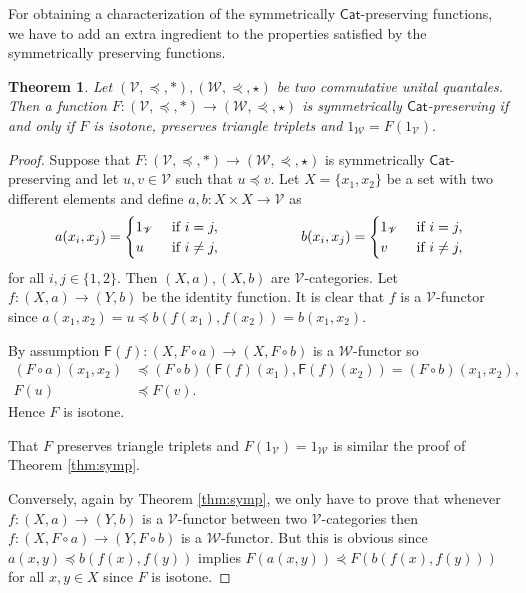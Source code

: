 \documentclass[11pt,a4paper]{amsart}
\newtheorem{theorem}{Theorem}[section]
\theoremstyle{definition}
\begin{document}
	For obtaining a characterization of the symmetrically $\mathsf{Cat}$-preserving functions, we have to add an extra ingredient to the properties satisfied by the symmetrically preserving functions.
	
	\begin{theorem}\label{thm:csymp}
		Let $(\mathscr{V},\preceq,\ast),(\mathscr{W},\curlyeqprec,\star)$ be two commutative unital quantales. Then a function $F:(\mathscr{V},\preceq,\ast)\to(\mathscr{W},\curlyeqprec,\star)$ is symmetrically $\mathsf{Cat}$-preserving if and only if  $F$ is isotone, preserves triangle triplets and $1_\mathscr{W}= F(1_\mathscr{V}).$
	\end{theorem}
	
	\begin{proof}
		Suppose that $F:(\mathscr{V},\preceq,\ast)\to(\mathscr{W},\curlyeqprec,\star)$ is symmetrically $\mathsf{Cat}$-preserving and let $u,v\in\mathscr{V}$ such that $u\preceq v.$ Let $X=\{x_1,x_2\}$ be a set with two different elements and define $a,b:X\times X\to \mathscr{V}$ as
		$$a(x_i,x_j)=\begin{cases}
			1_\mathscr{V}&\text{ if }i=j,\\
			u&\text{ if }i\neq j,\\
		\end{cases}\hspace*{2cm} b(x_i,x_j)=\begin{cases}
			1_\mathscr{V}&\text{ if }i=j,\\
			v&\text{ if }i\neq j,\\
		\end{cases}$$ 
		for all $i,j\in\{1,2\}.$ Then $(X,a), (X,b)$ are $\mathscr{V}$-categories. Let $f:(X,a)\to (Y,b)$ be the identity function. It is clear that $f$ is a $\mathscr{V}$-functor since $a(x_1,x_2)=u\preceq b(f(x_1),f(x_2))=b(x_1,x_2).$
		
		By assumption $\mathsf{F}(f): (X,F\circ a)\to (X,F\circ b)$ is a $\mathscr{W}$-functor so
		\begin{align*}
			(F\circ a)(x_1,x_2)&\preceq (F\circ b)(\mathsf{F}(f)(x_1),\mathsf{F}(f)(x_2))=(F\circ b)(x_1,x_2),\\
			F(u)&\preceq F(v).
		\end{align*}
		Hence $F$ is isotone.
		
		That $F$ preserves triangle triplets and $F(1_\mathscr{V})=1_\mathscr{W}$ is similar the proof of Theorem \ref{thm:symp}.
		
		Conversely, again by Theorem \ref{thm:symp}, we only have to prove that whenever $f:(X,a)\to (Y,b)$ is a $\mathscr{V}$-functor between two $\mathscr{V}$-categories then $f:(X,F\circ a)\to (Y,F\circ b)$ is a $\mathscr{W}$-functor. But this is obvious since $a(x,y)\preceq b(f(x),f(y))$ implies $F(a(x,y))\curlyeqprec F(b(f(x),f(y)))$ for all $x,y\in X$ since $F$ is isotone.
	\end{proof}
	
\end{document}
